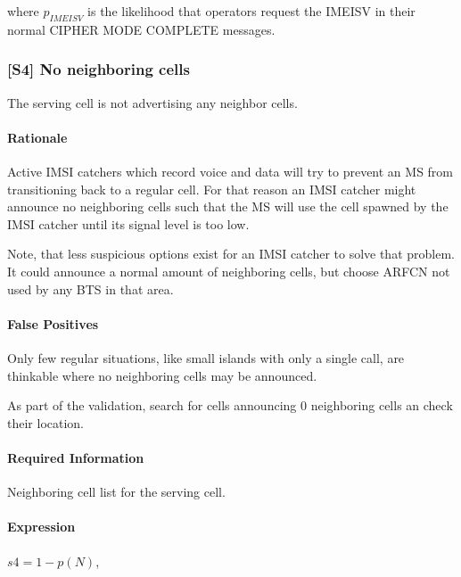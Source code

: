 \documentclass[a4paper,11pt,notitlepage,bigheadings,oneside]{scrartcl}
\begin{document}
where $p_{IMEISV}$ is the likelihood that operators request the IMEISV in their
normal CIPHER MODE COMPLETE messages.


\subsubsection{[S4] No neighboring cells}

The serving cell is not advertising any neighbor cells.

\paragraph{Rationale}

Active IMSI catchers which record voice and data will try to prevent an MS from
transitioning back to a regular cell. For that reason an IMSI catcher might
announce no neighboring cells such that the MS will use the cell spawned by the
IMSI catcher until its signal level is too low.

Note, that less suspicious options exist for an IMSI catcher to solve that
problem. It could announce a normal amount of neighboring cells, but choose
ARFCN not used by any BTS in that area.

\paragraph{False Positives}

Only few regular situations, like small islands with only a single call, are
thinkable where no neighboring cells may be announced.

\TBD{} As part of the validation, search for cells announcing 0 neighboring
cells an check their location.

\paragraph{Required Information}

Neighboring cell list for the serving cell.

\paragraph{Expression}

$s4 = 1 - p(N)$,
\end{document}
